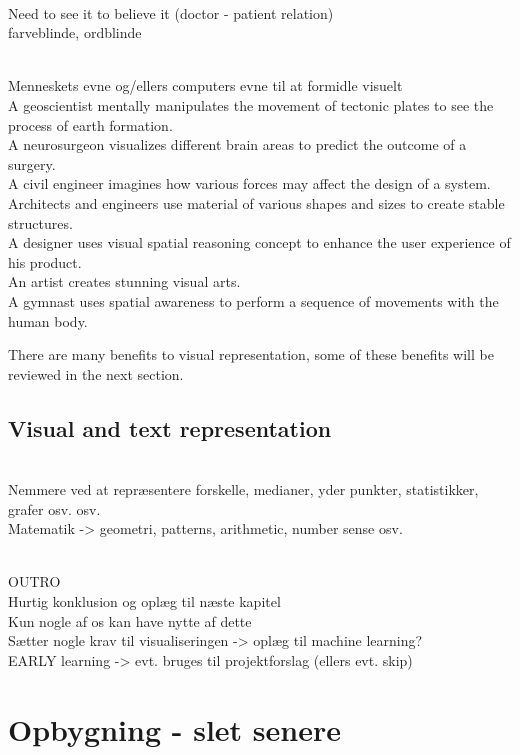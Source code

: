 \\Need to see it to believe it (doctor - patient relation)
\\farveblinde, ordblinde

\\Menneskets evne og/ellers computers evne til at formidle visuelt 
\\A geoscientist mentally manipulates the movement of tectonic plates to see the process of earth formation.
\\A neurosurgeon visualizes different brain areas to predict the outcome of a surgery.
\\A civil engineer imagines how various forces may affect the design of a system.
\\Architects and engineers use material of various shapes and sizes to create stable structures.
\\A designer uses visual spatial reasoning concept to enhance the user experience of his product.
\\An artist creates stunning visual arts.
\\A gymnast uses spatial awareness to perform a sequence of movements with the human body.

There are many benefits to visual representation, some of these benefits will be reviewed in the next section.
\subsection{Visual and text representation}\label{ch:visual_and_text_representation}
\\Nemmere ved at repræsentere forskelle, medianer, yder punkter, statistikker, grafer osv. osv.
\\Matematik -> geometri, patterns, arithmetic, number sense osv.


\\OUTRO
\\Hurtig konklusion og oplæg til næste kapitel
\\Kun nogle af os kan have nytte af dette
\\Sætter nogle krav til visualiseringen -> oplæg til machine learning?
\\EARLY learning -> evt. bruges til projektforslag (ellers evt. skip)

\section{Opbygning - slet senere}\label{ch:opbygning}

